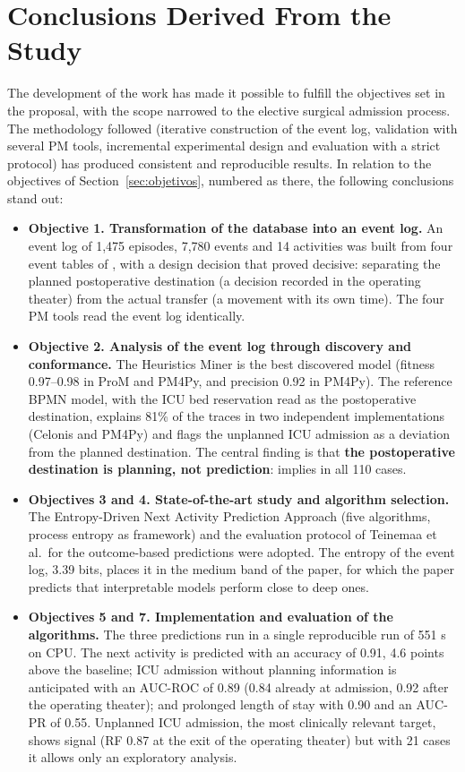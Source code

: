 \section{Conclusions Derived From the Study}

The development of the work has made it possible to fulfill the objectives set in the proposal, with the scope narrowed to the elective surgical admission process. The methodology followed (iterative construction of the event log, validation with several PM tools, incremental experimental design and evaluation with a strict protocol) has produced consistent and reproducible results. In relation to the objectives of Section~\ref{sec:objetivos}, numbered as there, the following conclusions stand out:

\begin{itemize}[leftmargin=*]
  \item \textbf{Objective 1. Transformation of the database into an event log.} An event log of 1,475 episodes, 7,780 events and 14 activities was built from four event tables of , with a design decision that proved decisive: separating the planned postoperative destination (a decision recorded in the operating theater) from the actual transfer (a movement with its own time). The four PM tools read the event log identically.
  \item \textbf{Objective 2. Analysis of the event log through discovery and conformance.} The Heuristics Miner is the best discovered model (fitness 0.97--0.98 in ProM and PM4Py, and precision 0.92 in PM4Py). The reference BPMN model, with the ICU bed reservation read as the postoperative destination, explains 81\% of the traces in two independent implementations (Celonis and PM4Py) and flags the unplanned ICU admission as a deviation from the planned destination. The central finding is that \textbf{the postoperative destination is planning, not prediction}:  implies  in all 110 cases.
  \item \textbf{Objectives 3 and 4. State-of-the-art study and algorithm selection.} The Entropy-Driven Next Activity Prediction Approach \cite{zare2025} (five algorithms, process entropy as framework) and the evaluation protocol of Teinemaa et al.\ for the outcome-based predictions were adopted. The entropy of the event log, 3.39 bits, places it in the medium band of the paper, for which the paper predicts that interpretable models perform close to deep ones.
  \item \textbf{Objectives 5 and 7. Implementation and evaluation of the algorithms.} The three predictions run in a single reproducible run of 551 s on CPU. The next activity is predicted with an accuracy of 0.91, 4.6 points above the baseline; ICU admission without planning information is anticipated with an AUC-ROC of 0.89 (0.84 already at admission, 0.92 after the operating theater); and prolonged length of stay with 0.90 and an AUC-PR of 0.55. Unplanned ICU admission, the most clinically relevant target, shows signal (RF 0.87 at the exit of the operating theater) but with 21 cases it allows only an exploratory analysis.

\end{itemize}
